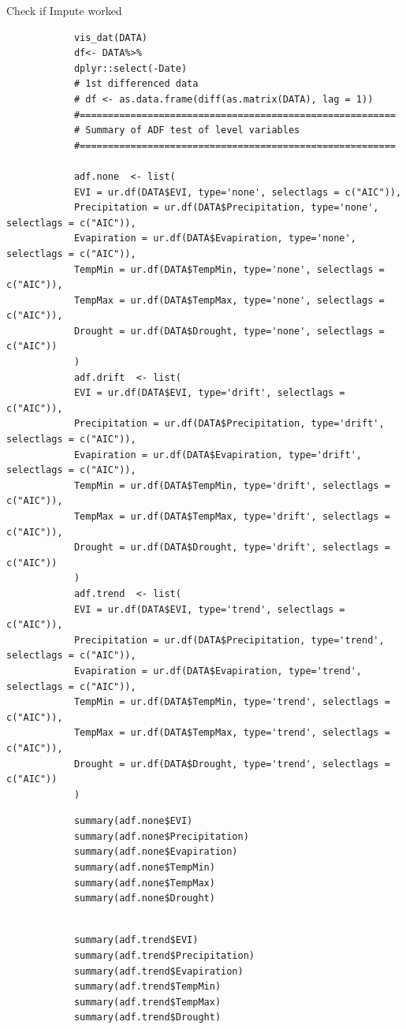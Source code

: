 \documentclass[12pt,a4paper]{book}
\begin{document}
			Check if Impute worked
				\begin{verbatim}
			vis_dat(DATA)
			df<- DATA%>%
			dplyr::select(-Date)
			# 1st differenced data
			# df <- as.data.frame(diff(as.matrix(DATA), lag = 1))
			#========================================================
			# Summary of ADF test of level variables
			#========================================================
			
			adf.none  <- list(
			EVI = ur.df(DATA$EVI, type='none', selectlags = c("AIC")),
			Precipitation = ur.df(DATA$Precipitation, type='none', selectlags = c("AIC")),
			Evapiration = ur.df(DATA$Evapiration, type='none', selectlags = c("AIC")),
			TempMin = ur.df(DATA$TempMin, type='none', selectlags = c("AIC")),
			TempMax = ur.df(DATA$TempMax, type='none', selectlags = c("AIC")),
			Drought = ur.df(DATA$Drought, type='none', selectlags = c("AIC"))
			)
			adf.drift  <- list(
			EVI = ur.df(DATA$EVI, type='drift', selectlags = c("AIC")),
			Precipitation = ur.df(DATA$Precipitation, type='drift', selectlags = c("AIC")),
			Evapiration = ur.df(DATA$Evapiration, type='drift', selectlags = c("AIC")),
			TempMin = ur.df(DATA$TempMin, type='drift', selectlags = c("AIC")),
			TempMax = ur.df(DATA$TempMax, type='drift', selectlags = c("AIC")),
			Drought = ur.df(DATA$Drought, type='drift', selectlags = c("AIC"))
			)
			adf.trend  <- list(
			EVI = ur.df(DATA$EVI, type='trend', selectlags = c("AIC")),
			Precipitation = ur.df(DATA$Precipitation, type='trend', selectlags = c("AIC")),
			Evapiration = ur.df(DATA$Evapiration, type='trend', selectlags = c("AIC")),
			TempMin = ur.df(DATA$TempMin, type='trend', selectlags = c("AIC")),
			TempMax = ur.df(DATA$TempMax, type='trend', selectlags = c("AIC")),
			Drought = ur.df(DATA$Drought, type='trend', selectlags = c("AIC"))
			)
				\end{verbatim}
	
				\begin{verbatim}			
			summary(adf.none$EVI)
			summary(adf.none$Precipitation)
			summary(adf.none$Evapiration)
			summary(adf.none$TempMin)
			summary(adf.none$TempMax)
			summary(adf.none$Drought)
			
				\end{verbatim}
	
			
				\begin{verbatim}
			summary(adf.trend$EVI)
			summary(adf.trend$Precipitation)
			summary(adf.trend$Evapiration)
			summary(adf.trend$TempMin)
			summary(adf.trend$TempMax)
			summary(adf.trend$Drought)			
				\end{verbatim}
\end{document}
